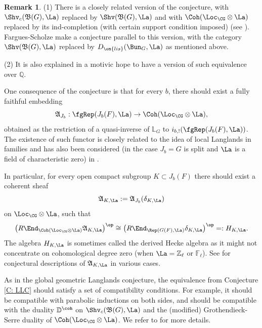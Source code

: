 \documentclass[11pt]{amsart}
\theoremstyle{definition}
\theoremstyle{definition}
\newtheorem{rmk}[thm]{Remark}
\theoremstyle{definition}
\numberwithin{equation}{section}
\newcommand{\frakA}{{\mathfrak A}}
\newcommand{\frakB}{{\mathfrak B}}
\newcommand{\bD}{{\mathbb D}}
\newcommand{\bF}{{\mathbb F}}
\newcommand{\bL}{{\mathbb L}}
\newcommand{\bQ}{{\mathbb Q}}
\newcommand{\bZ}{{\mathbb Z}}
\begin{document}
\begin{rmk}
(1) There is a closely related version of the conjecture, with $\Shv_{c}(\frakB(G),\La)$ replaced by $\Shv(\frakB(G),\La)$ and with $\Coh(\Loc_{\CG}\otimes\La)$ replaced by its ind-completion (with certain support condition imposed) (see \cite[Sect. 4.6]{Zhu-Conjecture}).
Fargues-Scholze \cite{Fargues-Scholze-Geometrization} make a conjecture parallel to this version, with the category $\Shv(\frakB(G),\La)$ replaced by $D_{\on{lis}}(\Bun_G,\La)$ as mentioned above.

(2) It is also explained in \cite{Zhu-Conjecture} a motivic hope to have a version of such equivalence over $\bQ$.
\end{rmk}
One consequence of the conjecture is that for every $b$, there should exist a fully faithful embedding
\begin{equation*}\label{E: functor A}
\frakA_{J_b}:  \fgRep(J_b(F),\La)\to  \Coh(\Loc_{\CG}\otimes\La),
\end{equation*}
obtained as the restriction of a quasi-inverse of $\bL_G$ to $i_{b,!}(\fgRep(J_b(F),\La))$.
The existence of such functor is closely related to the idea of local Langlands in families and has also been considered (in the case $J_b=G$ is split and $\La$ is a field of characteristic zero) in \cite{Hellmann-Iwahori, BCHN}. 

In particular, for every open compact subgroup $K\subset J_b(F)$ there should exist a coherent sheaf 
\begin{equation}\label{E: sheaf A}
\frakA_{K,\La}:=\frakA_{J_b}(\delta_{K,\La})
\end{equation} 
on $\Loc_{\CG}\otimes\La$, such that
\begin{equation}\label{E: Hecke alg isom}
\big(R\End_{\Coh(\Loc_{\CG}\otimes\La)}\frakA_{K,\La}\big)^{\op}\cong \big(R\End_{\Rep(G(F),\La)}\delta_{K,\La}\big)^{\op}=:H_{K,\La}.
\end{equation}
The algebra $H_{K,\La}$ is sometimes called the derived Hecke algebra as it might not concentrate on cohomological degree zero (when $\La=\bZ_\ell$ or $\bF_\ell$). 
See \cite[Sect. 4.3-4.5]{Zhu-Conjecture} for conjectural descriptions of $\frakA_{K,\La}$ in various cases.

As in the global geometric Langlands conjecture, the equivalence from Conjecture \ref{C: LLC} should satisfy a set of compatibility conditions. 
For example, it should be compatible with parabolic inductions on both sides, and should be compatible with the duality $\bD^{\coh}$ on $\Shv_c(\frakB(G),\La)$ and the (modified) Grothendieck-Serre duality of $\Coh(\Loc_{\CG}\otimes\La)$.  We refer to \cite{Zhu-Conjecture, Hemo-Zhu-Unipotent} for more details.
\end{document}

